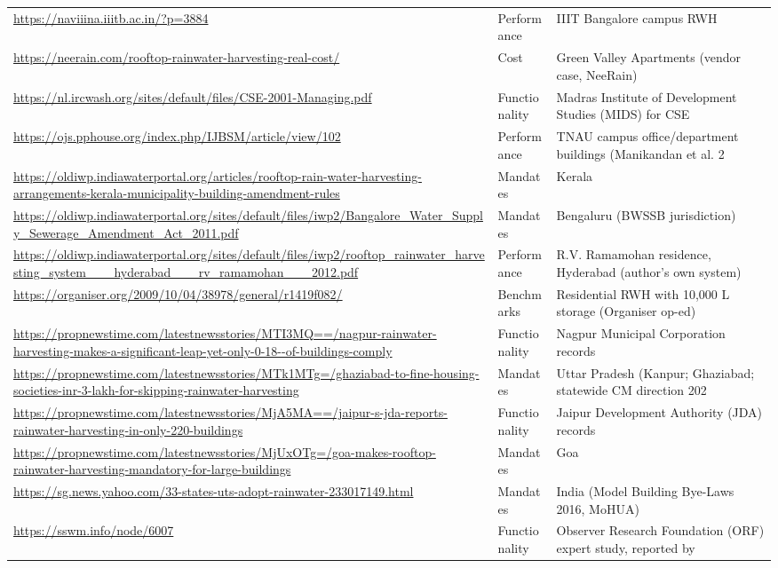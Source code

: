 {\begin{longtable}{p{9.2cm} p{2.5cm} p{4.2cm}}
\url{https://naviiina.iiitb.ac.in/?p=3884} & Performance & IIIT Bangalore campus RWH\\
\url{https://neerain.com/rooftop-rainwater-harvesting-real-cost/} & Cost & Green Valley Apartments (vendor case, NeeRain)\\
\url{https://nl.ircwash.org/sites/default/files/CSE-2001-Managing.pdf} & Functionality & Madras Institute of Development Studies (MIDS) for CSE\\
\url{https://ojs.pphouse.org/index.php/IJBSM/article/view/102} & Performance & TNAU campus office/department buildings (Manikandan et al. 2\\
\url{https://oldiwp.indiawaterportal.org/articles/rooftop-rain-water-harvesting-arrangements-kerala-municipality-building-amendment-rules} & Mandates & Kerala\\
\url{https://oldiwp.indiawaterportal.org/sites/default/files/iwp2/Bangalore_Water_Supply_Sewerage_Amendment_Act_2011.pdf} & Mandates & Bengaluru (BWSSB jurisdiction)\\
\url{https://oldiwp.indiawaterportal.org/sites/default/files/iwp2/rooftop_rainwater_harvesting_system___hyderabad___rv_ramamohan___2012.pdf} & Performance & R.V. Ramamohan residence, Hyderabad (author's own system)\\
\url{https://organiser.org/2009/10/04/38978/general/r1419f082/} & Benchmarks & Residential RWH with 10,000 L storage (Organiser op-ed)\\
\url{https://propnewstime.com/latestnewsstories/MTI3MQ==/nagpur-rainwater-harvesting-makes-a-significant-leap-yet-only-0-18--of-buildings-comply} & Functionality & Nagpur Municipal Corporation records\\
\url{https://propnewstime.com/latestnewsstories/MTk1MTg=/ghaziabad-to-fine-housing-societies-inr-3-lakh-for-skipping-rainwater-harvesting} & Mandates & Uttar Pradesh (Kanpur; Ghaziabad; statewide CM direction 202\\
\url{https://propnewstime.com/latestnewsstories/MjA5MA==/jaipur-s-jda-reports-rainwater-harvesting-in-only-220-buildings} & Functionality & Jaipur Development Authority (JDA) records\\
\url{https://propnewstime.com/latestnewsstories/MjUxOTg=/goa-makes-rooftop-rainwater-harvesting-mandatory-for-large-buildings} & Mandates & Goa\\
\url{https://sg.news.yahoo.com/33-states-uts-adopt-rainwater-233017149.html} & Mandates & India (Model Building Bye-Laws 2016, MoHUA)\\
\url{https://sswm.info/node/6007} & Functionality & Observer Research Foundation (ORF) expert study, reported by\\

\end{longtable}}
